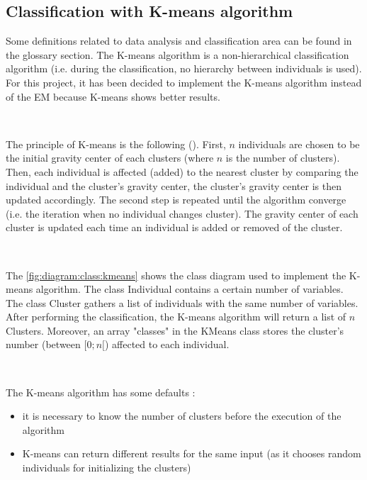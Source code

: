 \subsection{Classification with K-means algorithm}

Some definitions related to \gls{data analysis} and \gls{classification} area can be found in the glossary section. The K-means \gls{algorithm} is a non-hierarchical \gls{classification} \gls{algorithm} (i.e. during the \gls{classification}, no hierarchy between \glspl{individual} is used). For this project, it has been decided to implement the K-means \gls{algorithm} instead of the \gls{EM} because K-means shows better results. 

~~ 

The principle of K-means is the following (\cite{bib:clustering:AnalyseDesDonnees}). First, $n$ \glspl{individual} are chosen to be the initial gravity center of each \glspl{cluster} (where $n$ is the number of clusters). Then, each individual is affected (added) to the nearest \gls{cluster} by comparing the \gls{individual} and the \gls{cluster}'s gravity center, the \gls{cluster}'s gravity center is then  updated accordingly. The second step is repeated until the \gls{algorithm} converge (i.e. the iteration when no \gls{individual} changes \gls{cluster}). The gravity center of each \gls{cluster} is updated each time an \gls{individual} is added or removed of the \gls{cluster}.

~~

The \vref{fig:diagram:class:kmeans} shows the class diagram used to implement the K-means \gls{algorithm}. The class Individual contains a certain number of variables. The class Cluster gathers a list of individuals with the same number of variables. After performing the classification, the K-means \gls{algorithm} will return a list of $n$ Clusters. Moreover, an array "classes" in the KMeans class stores the \gls{cluster}'s number (between $[0;n[$) affected to each \gls{individual}.

~~

The K-means \gls{algorithm} has some defaults : 
\begin{itemize}
	\item it is necessary to know the number of clusters before the execution of the \gls{algorithm}
	\item K-means can return different results for the same input (as it chooses random \glspl{individual} for initializing the \glspl{cluster})
\end{itemize}


